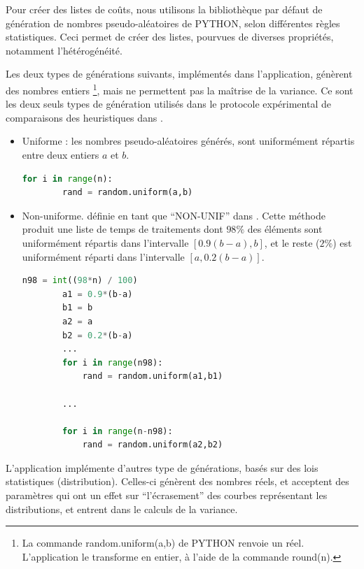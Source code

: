 \documentclass[a4paper,12pt]{report}
\theoremstyle{plain}				%
\theoremstyle{definition}				%
\begin{document}
\begin{appendices}
\bigskip
Pour créer des listes de coûts, nous utilisons la bibliothèque par défaut de génération de 
  nombres pseudo-aléatoires de PYTHON, selon différentes règles statistiques. 
Ceci permet de créer des listes, pourvues de diverses propriétés, notamment l’hétérogénéité. 

\bigskip
Les deux types de générations suivants, implémentés dans l'application, 
  génèrent des nombres entiers \footnote{\samepage La commande random.uniform(a,b) de PYTHON renvoie un réel. L'application le transforme en entier, à l'aide de la commande round(n).}, mais ne permettent pas la maîtrise de la variance. 
Ce sont les deux seuls types de génération utilisés dans le protocole expérimental de comparaisons des heuristiques dans \cite{della2020longest}.
   
\begin{itemize}
\item Uniforme : les nombres pseudo-aléatoires générés, sont uniformément répartis 
  entre deux entiers $a$ et $b$.
   
  \begin{lstlisting}[language=Python]
	for i in range(n):
		rand = random.uniform(a,b)
  \end{lstlisting}

\item Non-uniforme. définie en tant que ``NON-UNIF'' dans \cite{frangioni2004multi}. Cette méthode produit
  une liste de temps de traitements dont 
  $98\%$ des éléments sont uniformément répartis dans l’intervalle  $[0.9 (b-a), b]$, et 
  le reste ($2\%$) est uniformément réparti dans l'intervalle  $[a, 0.2 (b-a)]$.


  \begin{lstlisting}[language=Python]
	n98 = int((98*n) / 100)
	    a1 = 0.9*(b-a)
    	b1 = b
    	a2 = a
    	b2 = 0.2*(b-a)
		...
    	for i in range(n98):
       		rand = random.uniform(a1,b1)

    	...
    
    	for i in range(n-n98):
    		rand = random.uniform(a2,b2)
  \end{lstlisting}
  
\end{itemize}

\bigskip
L'application implémente d'autres type de générations, basés sur des lois statistiques (distribution). 
Celles-ci génèrent des nombres réels, et acceptent des paramètres qui ont un effet sur 
  ``l'écrasement'' des courbes représentant les distributions, 
  et entrent dans le calculs de la variance.


\end{appendices}
\end{document}
